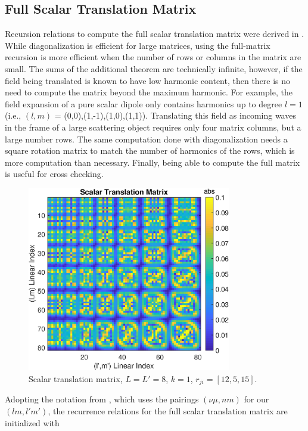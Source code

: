 {\footnotesize
{}
}

\clearpage
\subsection{Full Scalar Translation Matrix}

Recursion relations to compute the full scalar translation matrix were derived in \cite{chew1992recurrence}. While diagonalization is efficient for large matrices, using the full-matrix recursion is more efficient when the number of rows or columns in the matrix are small. The sums of the additional theorem are technically infinite, however, if the field being translated is known to have low harmonic content, then there is no need to compute the matrix beyond the maximum harmonic. For example, the field expansion of a pure scalar dipole only contains harmonics up to degree $l = 1$ (i.e., $(l,m)$ = (0,0),(1,-1),(1,0),(1,1)). Translating this field as incoming waves in the frame of a large scattering object requires only four matrix columns, but a large number rows. The same computation done with diagonalization needs a square rotation matrix to match the number of harmonics of the rows, which is more computation than necessary. Finally, being able to compute the full matrix is useful for cross checking. 


\begin{figure}[H] 
\centering
   \includegraphics[width=3.5in]{Translation/Figures/transfull} 
   \caption{Scalar translation matrix, $L = L' = 8$, $k = 1$, $r_{ji} = [12, 5, 15]$.} 
\end{figure}


Adopting the notation from \cite{chew1992recurrence}, which uses the pairings $(\nu\mu,nm)$ for our $(lm,l'm')$, the recurrence relations for the full scalar translation matrix are initialized with

